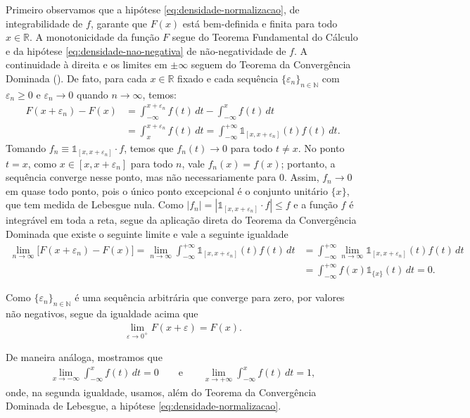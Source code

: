 \documentclass[12pt,portuguese]{article}
\theoremstyle{definition}
\theoremstyle{plainexercise}
\theoremstyle{starredexercise}
\theoremstyle{definition}
\begin{document}
Primeiro observamos que a hipótese \eqref{eq:densidade-normalizacao},
de integrabilidade de $f$, garante que $F(x)$ está bem-definida e finita para todo $x\in\mathbb{R}$. 
A monotonicidade da função $F$ segue do 
Teorema Fundamental do Cálculo e da hipótese \eqref{eq:densidade-nao-negativa} de não-negatividade de $f$.
A continuidade à direita e os limites em $\pm\infty$ seguem do 
Teorema da Convergência Dominada (). 
De fato, para cada $x\in\mathbb{R}$ fixado e cada sequência $\{\varepsilon_n\}_{n\in\mathbb{N}}$ 
com $\varepsilon_n\geqslant 0$ e $\varepsilon_n\to 0$ quando $n\to\infty$, temos: 
\begin{align*}
F(x+\varepsilon_n) -F(x) 
&= 
\int_{-\infty}^{x+\varepsilon_n} f(t)\, dt 
-
\int_{-\infty}^{x} f(t)\, dt 
\\[0.3cm]
&= \int_{x}^{x+\varepsilon_n} f(t)\, dt
= \int_{-\infty}^{+\infty} \mathds{1}_{[x,x+\varepsilon_n]}(t) f(t)\, dt.
\end{align*}
Tomando $f_n \equiv \mathds{1}_{[x,x+\varepsilon_n]}\cdot f$, temos que
$f_n(t)\to 0$ para todo $t\neq x$. No ponto $t=x$, como
$x\in[x,x+\varepsilon_n]$ para todo $n$, vale $f_n(x)=f(x)$; portanto, a
sequência converge nesse ponto, mas não necessariamente para $0$. Assim,
$f_n\to 0$ em quase todo ponto, pois o único ponto excepcional é o conjunto
unitário $\{x\}$, que tem medida de Lebesgue nula. Como
$|f_n| = |\mathds{1}_{[x,x+\varepsilon_n]}\cdot f| \leqslant f$
e a função $f$ é integrável em toda a reta,
segue da aplicação direta do Teorema da Convergência Dominada que
existe o seguinte limite e vale a seguinte igualdade 
\begin{align*}
\lim_{n\to\infty} \bigl[F(x+\varepsilon_n) -F(x)\bigr] 
=
\lim_{n\to\infty} 
\int_{-\infty}^{+\infty} \mathds{1}_{[x,x+\varepsilon_n]}(t) f(t)\, dt
&=
\int_{-\infty}^{+\infty}
\lim_{n\to\infty}  \mathds{1}_{[x,x+\varepsilon_n]}(t) f(t)\, dt
\\[0.3cm]
&=
\int_{-\infty}^{+\infty} f(x)\mathds{1}_{\{x\}}(t)\,dt =0.
\end{align*} 

Como $\{\varepsilon_n\}_{n\in\mathbb{N}}$ é uma sequência arbitrária que converge
para zero, por valores não negativos, segue da igualdade acima que
\begin{align*}
\lim_{\varepsilon\to 0^{+}} F(x+\varepsilon) = F(x). 
\end{align*}

De maneira análoga, mostramos que 
\begin{align*}
\lim_{x\to -\infty} \int_{-\infty}^{x} f(t)\, dt = 0 
\qquad \text{e}\qquad 
\lim_{x\to +\infty} \int_{-\infty}^{x} f(t)\, dt = 1,
\end{align*}
onde, na segunda igualdade, usamos, além do Teorema da Convergência Dominada 
de Lebesgue, a hipótese \eqref{eq:densidade-normalizacao}.
\end{document}
